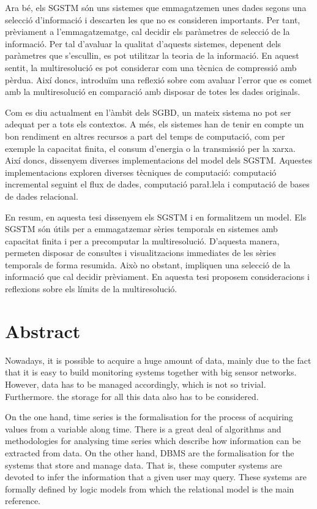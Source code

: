 Ara bé, els \gls{SGSTM} són uns sistemes que emmagatzemen unes dades
segons una selecció d'informació i descarten les que no es consideren
importants. Per tant, prèviament a l'emmagatzematge, cal decidir els
paràmetres de selecció de la informació. Per tal d'avaluar la qualitat
d'aquests sistemes, depenent dels paràmetres que s'escullin, es pot
utilitzar la teoria de la informació. En aquest sentit, la
multiresolució es pot considerar com una tècnica de compressió amb
pèrdua. Així doncs, introduïm una reflexió sobre com avaluar l'error
que es comet amb la multiresolució en comparació amb disposar de totes
les dades originals.




Com es diu actualment en l'àmbit dels \gls{SGBD}, un mateix sistema no
pot ser adequat per a tots els contextos. A més, els sistemes han de
tenir en compte un bon rendiment en altres recursos a part del temps
de computació, com per exemple la capacitat finita, el consum
d'energia o la transmissió per la xarxa. Així doncs, dissenyem
diverses implementacions del model dels \gls{SGSTM}. Aquestes
implementacions exploren diverses tècniques de computació: computació
incremental seguint el flux de dades, computació para\l.lela i
computació de bases de dades relacional.


En resum, en aquesta tesi dissenyem els \gls{SGSTM} i en formalitzem
un model.  Els \gls{SGSTM} són útils per a emmagatzemar sèries
temporals en sistemes amb capacitat finita i per a precomputar la
multiresolució. D'aquesta manera, permeten disposar de consultes i
visualitzacions immediates de les sèries temporals de forma
resumida. Això no obstant, impliquen una selecció de la informació que
cal decidir prèviament. En aquesta tesi proposem consideracions i
reflexions sobre els límits de la multiresolució.





\chapter*{Abstract}

Nowadays, it is possible to acquire a huge amount of data, mainly due
to the fact that it is easy to build monitoring systems together with
big sensor networks. However, data has to be managed accordingly,
which is not so trivial. Furthermore. the storage for all this data
also has to be considered.


On the one hand, time series is the formalisation for the process of
acquiring values from a variable along time. There is a great deal of
algorithms and methodologies for analysing time series which describe
how information can be extracted from data. On the other hand,
\gls{DBMS} are the formalisation for the systems that store and
manage data. That is, these computer systems are devoted to infer the
information that a given user may query.  These systems are formally
defined by logic models from which the relational model is the main
reference.

